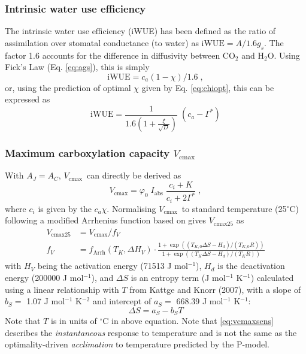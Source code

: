 \documentclass{myreport}
\newcommand{\vcmax}{$V_{\text{cmax}}$}
\begin{document}

\subsubsection{Intrinsic water use efficiency}
The intrinsic water use efficiency (iWUE) has been defined as the ratio of assimilation over stomatal conductance (to water) \cite{beer09gbc} as $\text{iWUE} = A / 1.6 g_s$. The factor 1.6 accounts for the difference in diffusivity between CO$_2$ and H$_2$O. Using Fick's Law (Eq. \ref{eq:ags}), this is simply
\begin{equation}
    \mathrm{iWUE} = c_a (1-\chi)/1.6 \;,
\end{equation}
or, using the prediction of optimal $\chi$ given by Eq. \ref{eq:chiopt}, this can be expressed as
\begin{equation}
    \text{iWUE} = \frac{1}{1.6 \left( 1+ \frac{\xi}{\sqrt{D}} \right) }\; (c_a - \Gamma^\ast)
\end{equation}

\subsubsection{Maximum carboxylation capacity $V_{\mathrm{cmax}}$}
With $A_J=A_C$, \vcmax\ can directly be derived as 
\begin{equation}
    \label{eq:vcmax}
    V_{\mathrm{cmax}} = \varphi_0\;I_{\mathrm{abs}}\;\frac{c_i + K}{c_i + 2\Gamma^\ast} \;,
\end{equation}
where $c_i$ is given by the $c_a \chi$. Normalising \vcmax\ to standard temperature (25$^{\circ}$C) following a modified Arrhenius function based on \cite{kattge07} gives $V_{\mathrm{cmax25}}$ as
\begin{align}
    V_{\mathrm{cmax25}} &= V_{\mathrm{cmax}} / f_V \\ 
    \label{eq:vcmaxsens}
    f_V &= f_{\text{Arrh}}(T_K, \Delta H_V) \cdot \frac{1+\exp( (T_{K,0}\Delta S-H_d) / (T_{K,0} R) )}{1+\exp( (T_K\Delta S - H_d)/(T_K R) )}
\end{align}
with $H_V$ being the activation energy (71513 J mol$^{-1}$), $H_d$ is the deactivation energy (200000 J mol$^{-1}$), and $\Delta S$ is an entropy term (J mol$^{-1}$ K$^{-1}$) calculated using a linear relationship with $T$ from Kattge and Knorr (2007), with a slope of $b_S =$ 1.07 J mol$^{-1}$ K$^{-2}$ and intercept of $a_S = $ 668.39 J mol$^{-1}$ K$^{-1}$:
\begin{equation}
    \Delta S = a_S - b_S T
\end{equation}
Note that $T$ is in units of $^{\circ}$C in above equation. Note that \ref{eq:vcmaxsens} describes the \textit{instantaneous} response to temperature and is not the same as the optimality-driven \textit{acclimation} to temperature predicted by the P-model.
\end{document}
